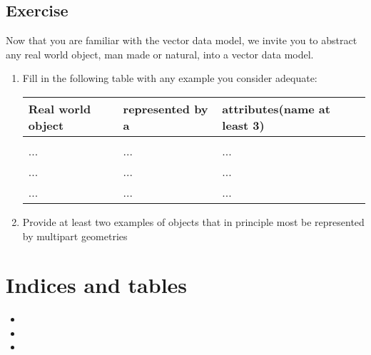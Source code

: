 \documentclass[letterpaper,10pt,english]{sphinxmanual}
\begin{document}
\section{Exercise}
\label{\detokenize{vector_representations:exercise}}
Now that you are familiar with the vector data model, we invite you to abstract any real world object, man made or natural, into a vector data model.
\begin{enumerate}
%
\item {} 
 Fill in the following table with any example you consider adequate:


\begin{savenotes}\sphinxattablestart
\centering
\begin{tabulary}{\linewidth}[t]{|T|T|T|}
\hline
\sphinxstyletheadfamily 
Real world object
&\sphinxstyletheadfamily 
represented by a
&\sphinxstyletheadfamily 
attributes(name at least 3)
\\
\hline
{}
&
&
\\
\hline
...
&
...
&
...
\\
\hline
...
&
...
&
...
\\
\hline
...
&
...
&
...
\\
\hline
\end{tabulary}
\par
\sphinxattableend\end{savenotes}

\begin{DUlineblock}{0em}
\item[] 
\end{DUlineblock}

\item {} 
 Provide at least two examples of objects that in principle most be represented by multi\sphinxhyphen{}part geometries

\end{enumerate}


\chapter{Indices and tables}
\label{\detokenize{index:indices-and-tables}}\begin{itemize}
\item {} 

\item {} 

\item {} 

\end{itemize}



\renewcommand{\indexname}{Index}
\printindex
\end{document}
